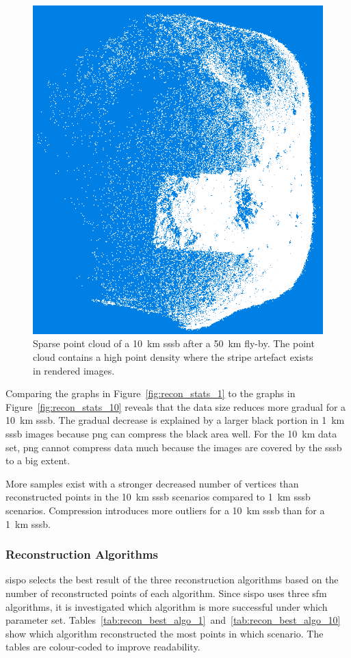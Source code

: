 \begin{figure}[htb]
    \centering
    \includegraphics[width=.5\textwidth]{doc/thesis/0_figures/models_quality/50_10/120_50_10_point1.png}
    \caption{Sparse point cloud of a \SI{10}{\kilo\meter} \gls{sssb} after a \SI{50}{\kilo\meter} fly-by. The point cloud contains a high point density where the stripe artefact exists in rendered images.}
    \label{fig:point_cloud_stripe}
\end{figure}

Comparing the graphs in Figure~\ref{fig:recon_stats_1} to the graphs in Figure~\ref{fig:recon_stats_10} reveals that the data size reduces more gradual for a \SI{10}{\kilo\meter} \gls{sssb}. The gradual decrease is explained by a larger black portion in \SI{1}{\kilo\meter} \gls{sssb} images because \gls{png} can compress the black area well. For the \SI{10}{\kilo\meter} data set, \gls{png} cannot compress data much because the images are covered by the \gls{sssb} to a big extent.

More samples exist with a stronger decreased number of vertices than reconstructed points in the \SI{10}{\kilo\meter} \gls{sssb} scenarios compared to \SI{1}{\kilo\meter} \gls{sssb} scenarios. Compression introduces more outliers for a \SI{10}{\kilo\meter} \gls{sssb} than for a \SI{1}{\kilo\meter} \gls{sssb}.

\subsubsection{Reconstruction Algorithms}
\gls{sispo} selects the best result of the three reconstruction algorithms based on the number of reconstructed points of each algorithm. Since \gls{sispo} uses three \gls{sfm} algorithms, it is investigated which algorithm is more successful under which parameter set. Tables~\ref{tab:recon_best_algo_1}~and~\ref{tab:recon_best_algo_10} show which algorithm reconstructed the most points in which scenario. The tables are colour-coded to improve readability.

